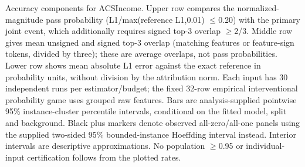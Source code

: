 Accuracy components for ACSIncome. Upper row compares the normalized-magnitude pass probability (L1/max(reference L1,0.01) $\leq$0.20) with the primary joint event, which additionally requires signed top-3 overlap $\geq$2/3. Middle row gives mean unsigned and signed top-3 overlap (matching features or feature-sign tokens, divided by three); these are average overlaps, not pass probabilities. Lower row shows mean absolute L1 error against the exact reference in probability units, without division by the attribution norm. Each input has 30 independent runs per estimator/budget; the fixed 32-row empirical interventional probability game uses grouped raw features. Bars are analysis-supplied pointwise 95\% instance-cluster percentile intervals, conditional on the fitted model, split and background. Black plus markers denote observed all-zero/all-one panels using the supplied two-sided 95\% bounded-instance Hoeffding interval instead. Interior intervals are descriptive approximations. No population $\geq$0.95 or individual-input certification follows from the plotted rates.
